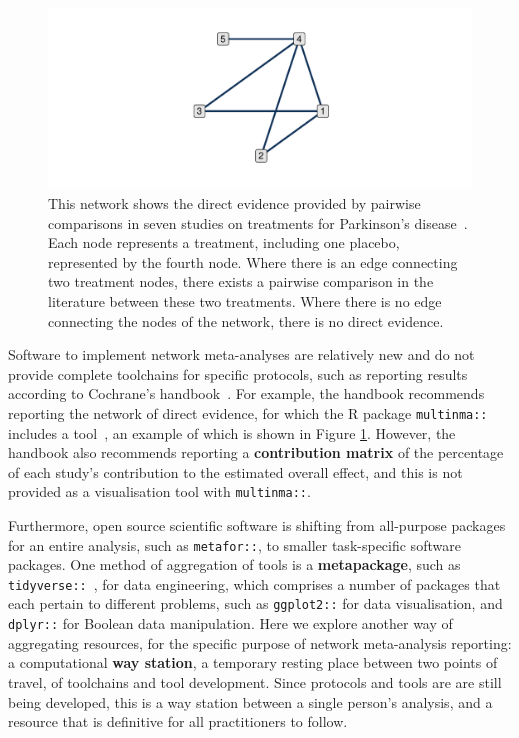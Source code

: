 \documentclass[12pt]{article}\usepackage[]{graphicx}\usepackage[]{color}
\makeatletter
\def\maxwidth{ %
  \ifdim\Gin@nat@width>\linewidth
    \linewidth
  \else
    \Gin@nat@width
  \fi
}
\newenvironment{knitrout}{}{} %
\newcommand{\package}[1]{\texttt{{#1::}}}
\makeatother
\begin{document}
\begin{figure}
\centering
\begin{knitrout}
\color{fgcolor}
\includegraphics[width=\maxwidth]{figure/network-1} 

\end{knitrout}
\caption{This network shows the direct evidence provided by pairwise comparisons in seven studies on treatments for Parkinson's disease~\cite{phillippo_multinma_2020}. Each node represents a treatment, including one placebo, represented by the fourth node. Where there is an edge connecting two treatment nodes, there exists a pairwise comparison in the literature between these two treatments. Where there is no edge connecting the nodes of the network, there is no direct evidence.}
\label{fig:network}
\end{figure}

Software to implement network meta-analyses are relatively new and do not provide complete toolchains for specific protocols, such as reporting results according to Cochrane's handbook~\cite{higgins2019cochrane}. For example, the handbook recommends reporting the network of direct evidence, for which the R package \package{multinma} includes a tool~\cite{phillippo_multinma_2020}, an example of which is shown in Figure \ref{fig:network}. However, the handbook also recommends reporting a \textbf{contribution matrix} of the percentage of each study's contribution to the estimated overall effect, and this is not provided as a visualisation tool with \package{multinma}.

Furthermore, open source scientific software is shifting from all-purpose packages for an entire analysis, such as \package{metafor}, to smaller task-specific software packages. One method of aggregation of tools is a \textbf{metapackage}, such as \package{tidyverse}~\cite{wickham_tidyverse_2017}, for data engineering, which comprises a number of packages that each pertain to different problems, such as \package{ggplot2} for data visualisation, and \package{dplyr} for Boolean data manipulation. Here we explore another way of aggregating resources, for the specific purpose of network meta-analysis reporting: a computational \textbf{way station}, a temporary resting place between two points of travel, of toolchains and tool development. Since protocols and tools are are still being developed, this is a way station between a single person's analysis, and a resource that is definitive for all practitioners to follow.
\end{document}
